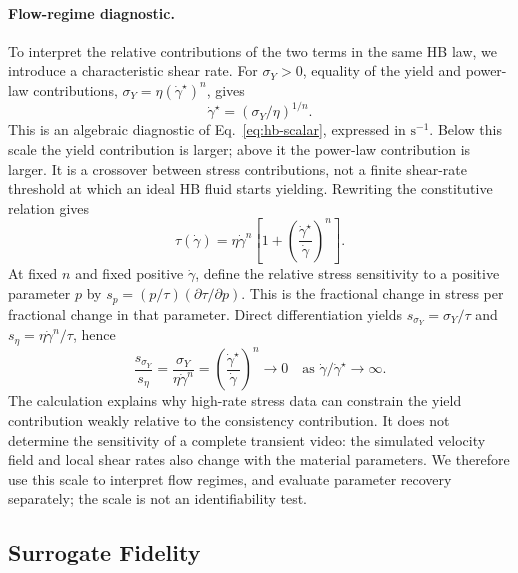 \paragraph{Flow-regime diagnostic.}
\label{sec:flow-regime-diagnostic}
To interpret the relative contributions of the two terms in the same
HB law, we introduce a characteristic shear rate. For
$\sigma_Y>0$, equality of the yield and power-law contributions,
$\sigma_Y=\eta(\dot\gamma^\star)^n$, gives
\begin{equation}
\label{eq:gammastar}
    \dot\gamma^\star=(\sigma_Y/\eta)^{1/n}.
\end{equation}
This is an algebraic diagnostic of Eq.~\eqref{eq:hb-scalar},
expressed in $\mathrm{s}^{-1}$. Below this scale the yield contribution
is larger; above it the power-law contribution is larger. It is a
crossover between stress contributions, not a finite shear-rate
threshold at which an ideal HB fluid starts yielding. Rewriting the
constitutive relation gives
\begin{equation}
\label{eq:hb-factored}
    \tau(\dot\gamma)=\eta\dot\gamma^n
    \left[1+\left(\frac{\dot\gamma^\star}{\dot\gamma}\right)^n\right].
\end{equation}
At fixed $n$ and fixed positive $\dot\gamma$, define the relative
stress sensitivity to a positive parameter $p$ by
$s_p=(p/\tau)(\partial\tau/\partial p)$. This is the fractional
change in stress per fractional change in that parameter. Direct
differentiation yields $s_{\sigma_Y}=\sigma_Y/\tau$ and
$s_\eta=\eta\dot\gamma^n/\tau$, hence
\begin{equation}
\label{eq:ridge}
    \frac{s_{\sigma_Y}}{s_\eta}
    =\frac{\sigma_Y}{\eta\dot\gamma^n}
    =\left(\frac{\dot\gamma^\star}{\dot\gamma}\right)^n
    \longrightarrow0
    \quad\text{as }\dot\gamma/\dot\gamma^\star\to\infty.
\end{equation}
The calculation explains why high-rate stress data can constrain the
yield contribution weakly relative to the consistency contribution.
It does not determine the sensitivity of a complete transient video:
the simulated velocity field and local shear rates also change with
the material parameters. We therefore use this scale to interpret
flow regimes, and evaluate parameter recovery separately; the scale is not an identifiability test.


\subsection{Surrogate Fidelity}
\label{sec:fidelity}

